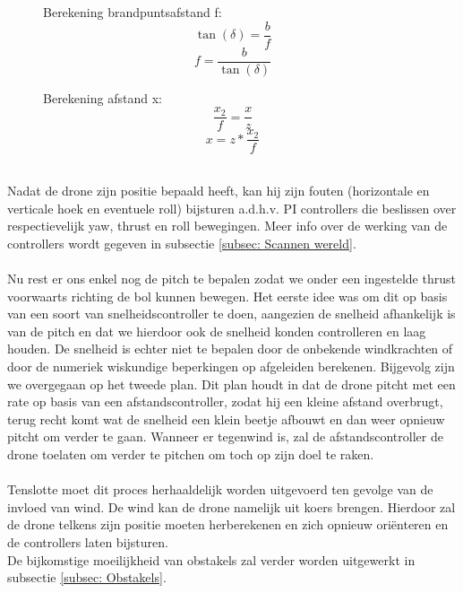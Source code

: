 \begin{figure}[h]
	\centering
	\begin{minipage}{.5\textwidth}
		Berekening brandpuntsafstand f:
		\begin{equation} \label{eq:RelatieveVerticaleHoekBegin}
		\tan(\delta) = \frac{b}{f}
		\end{equation}
		\begin{equation} 
		f = \frac{b}{\tan(\delta)}
		\end{equation}
	\end{minipage}
	\begin{minipage}{.45\textwidth}
		Berekening afstand x:
		\begin{equation} 
		\frac{x_2}{f} = \frac{x}{z}
		\end{equation}
		\begin{equation} \label{eq:RelatieveVerticaleHoekEind}
		x = z * \frac{x_2}{f}	
		\end{equation}
	\end{minipage}%
\end{figure}
\\
Nadat de drone zijn positie bepaald heeft, kan hij zijn fouten (horizontale en verticale hoek en eventuele roll) bijsturen a.d.h.v. PI controllers die beslissen over respectievelijk yaw, thrust en roll bewegingen. Meer info over de werking van de controllers wordt gegeven in subsectie \ref{subsec: Scannen wereld}.
\\
\\
Nu rest er ons enkel nog de pitch te bepalen zodat we onder een ingestelde thrust voorwaarts richting de bol kunnen bewegen. Het eerste idee was om dit op basis van een soort van snelheidscontroller te doen, aangezien de snelheid afhankelijk is van de pitch en dat we hierdoor ook de snelheid konden controlleren en laag houden. De snelheid is echter niet te bepalen door de onbekende windkrachten of door de numeriek wiskundige beperkingen op afgeleiden berekenen. Bijgevolg zijn we overgegaan op het tweede plan. Dit plan houdt in dat de drone pitcht met een rate op basis van een afstandscontroller, zodat hij een kleine afstand overbrugt, terug recht komt wat de snelheid een klein beetje afbouwt en dan weer opnieuw pitcht om verder te gaan. Wanneer er tegenwind is, zal de afstandscontroller de drone toelaten om verder te pitchen om toch op zijn doel te raken.
\\
\\
Tenslotte moet dit proces herhaaldelijk worden uitgevoerd ten gevolge van de invloed van wind. De wind kan de drone namelijk uit koers brengen. Hierdoor zal de drone telkens zijn positie moeten herberekenen en zich opnieuw ori\"enteren en de controllers laten bijsturen.
\\
De bijkomstige moeilijkheid van obstakels zal verder worden uitgewerkt in subsectie \ref{subsec: Obstakels}.

